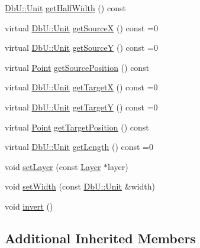 \begin{DoxyCompactItemize}
\item 
\mbox{\hyperlink{group__DbUGroup_ga4fbfa3e8c89347af76c9628ea06c4146}{Db\+U\+::\+Unit}} \mbox{\hyperlink{classHurricane_1_1Segment_a58e4abcf545ad5c89ca2854a2b4471f8}{get\+Half\+Width}} () const
\item 
virtual \mbox{\hyperlink{group__DbUGroup_ga4fbfa3e8c89347af76c9628ea06c4146}{Db\+U\+::\+Unit}} \mbox{\hyperlink{classHurricane_1_1Segment_a0347e3bde8e2e90b05cffdaf2d048710}{get\+SourceX}} () const =0
\item 
virtual \mbox{\hyperlink{group__DbUGroup_ga4fbfa3e8c89347af76c9628ea06c4146}{Db\+U\+::\+Unit}} \mbox{\hyperlink{classHurricane_1_1Segment_abf305dd4510de6fe6fae5286acbe285a}{get\+SourceY}} () const =0
\item 
virtual \mbox{\hyperlink{classHurricane_1_1Point}{Point}} \mbox{\hyperlink{classHurricane_1_1Segment_a41c4b88c35b9af0ad741205d0a8ea9c2}{get\+Source\+Position}} () const
\item 
virtual \mbox{\hyperlink{group__DbUGroup_ga4fbfa3e8c89347af76c9628ea06c4146}{Db\+U\+::\+Unit}} \mbox{\hyperlink{classHurricane_1_1Segment_abba6713e109a0925c078a9785274f389}{get\+TargetX}} () const =0
\item 
virtual \mbox{\hyperlink{group__DbUGroup_ga4fbfa3e8c89347af76c9628ea06c4146}{Db\+U\+::\+Unit}} \mbox{\hyperlink{classHurricane_1_1Segment_a27d530abcff9742b81c4b549db161b90}{get\+TargetY}} () const =0
\item 
virtual \mbox{\hyperlink{classHurricane_1_1Point}{Point}} \mbox{\hyperlink{classHurricane_1_1Segment_af24bee306be3461bb5dd1ba680f2a2df}{get\+Target\+Position}} () const
\item 
virtual \mbox{\hyperlink{group__DbUGroup_ga4fbfa3e8c89347af76c9628ea06c4146}{Db\+U\+::\+Unit}} \mbox{\hyperlink{classHurricane_1_1Segment_a9f6c42c2de0330aa6a486cdbf550cea1}{get\+Length}} () const =0
\item 
void \mbox{\hyperlink{classHurricane_1_1Segment_acd0b0cd25c824ba7f3b1ff2776c97cf1}{set\+Layer}} (const \mbox{\hyperlink{classHurricane_1_1Layer}{Layer}} $\ast$layer)
\item 
void \mbox{\hyperlink{classHurricane_1_1Segment_aec203d5d3aa96150979ba532d4bd1c7d}{set\+Width}} (const \mbox{\hyperlink{group__DbUGroup_ga4fbfa3e8c89347af76c9628ea06c4146}{Db\+U\+::\+Unit}} \&width)
\item 
void \mbox{\hyperlink{classHurricane_1_1Segment_aceaa61242eb7275cf9c6a39cf1868c53}{invert}} ()
\end{DoxyCompactItemize}
\subsection*{Additional Inherited Members}



